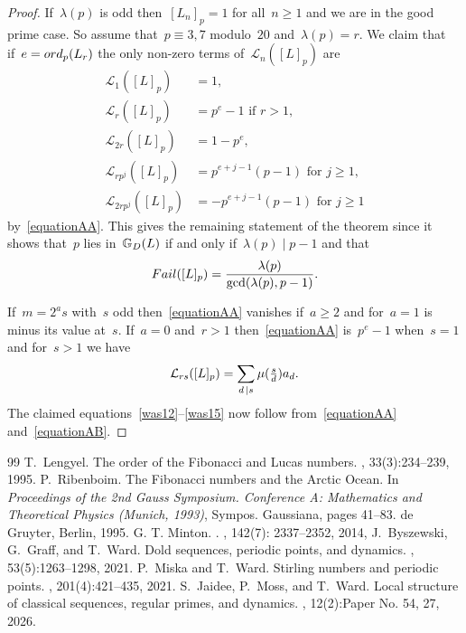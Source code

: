 \documentclass[10pt,a4paper]{amsart}
\numberwithin{equation}{section} %
\numberwithin{table}{section} %
\numberwithin{figure}{section}
\def\gooddoldprimes{\mathbb{G}_{\rm{D}}}
\newcommand\ord{{\rm{ord}}}
\newcommand\failure{{\rm{Fail}}}
\newcommand\least{{\mathcal{L}}}
\newcommand\divides\mid
\newcommand\smalldivides{\mathrel{\kern-2pt\kern3.5pt|}}
\def\ge{\geqslant}
\begin{document}
\begin{proof}
If~$\lambda(p)$ is odd then~$[L_n]_p=1$ for all~$n\ge1$
and we are in the good prime case.
So assume that~$p\equiv3,7$ modulo~$20$
and~$\lambda(p)=r$.
We claim that if~$e=\ord_p(L_{r})$ the
only non-zero terms of~$\least_n([L]_p)$ are
\begin{align}
\least_1([L]_p)&=1,\nonumber\\
\least_{r}([L]_p)&=p^e-1\mbox{ if }r>1,\label{was12}\\
\least_{2r}([L]_p)&=1-p^e,\nonumber\\
\least_{rp^j}([L]_p)&=p^{e+j-1}(p-1)\mbox{ for }j\ge1,\nonumber\\
\least_{2rp^j}([L]_p)&=-p^{e+j-1}(p-1)\mbox{ for }j\ge1\label{was15}
\end{align}
by~\eqref{equationAA}.
This gives the remaining statement of the theorem
since it shows that~$p$
lies in~$\gooddoldprimes(L)$
if and only if~$\lambda(p)\divides p-1$ and that
\[
\failure([L]_p)
=
\frac{\lambda(p)}{\gcd(\lambda(p),p-1)}.
\]

If~$m=2^as$ with~$s$ odd then~\eqref{equationAA}
vanishes if~$a\ge2$ and for~$a=1$ is minus
its value at~$s$.
If~$a=0$ and~$r>1$ then~\eqref{equationAA} is~$p^e-1$
when~$s=1$ and for~$s>1$ we have
\begin{equation}\label{equationAB}
\least_{rs}([L]_p)
=
\sum_{d\smalldivides s}\mu(\tfrac{s}{d})a_d.
\end{equation}
The claimed equations~\eqref{was12}--\eqref{was15}
now follow from~\eqref{equationAA} and~\eqref{equationAB}.
\end{proof}

\begin{thebibliography}{99}
 T.~Lengyel. \newblock The order of the {F}ibonacci and {L}ucas numbers. , 33(3):234--239, 1995.
 P.~Ribenboim. \newblock The {F}ibonacci numbers and the {A}rctic {O}cean. \newblock In {\em Proceedings of the 2nd {G}auss {S}ymposium. {C}onference {A}: {M}athematics and {T}heoretical {P}hysics ({M}unich, 1993)}, Sympos. Gaussiana, pages 41--83. de Gruyter, Berlin, 1995.
 G. T. Minton. . , {142}(7): 2337--2352, 2014,
 J.~Byszewski, G.~Graff, and T.~Ward. \newblock Dold sequences, periodic points, and dynamics. , 53(5):1263--1298, 2021.
 P.~Miska and T.~Ward. \newblock Stirling numbers and periodic points. , 201(4):421--435, 2021.
 S.~Jaidee, P.~Moss, and T.~Ward. \newblock Local structure of classical sequences, regular primes, and dynamics. , 12(2):Paper No. 54, 27, 2026.
\end{thebibliography}
\end{document}

